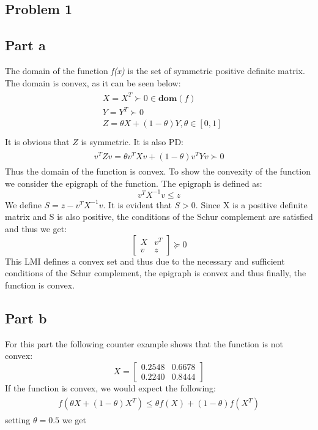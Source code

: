 \documentclass[a4paper]{article}
\begin{document}
\thispagestyle{empty}
\newpage
\begin{Large}
	\section*{Problem 1}
	\subsection*{Part a}
	The domain of the function \textit{f(x)} is the set of symmetric positive definite matrix. The domain is convex, as it can be seen below:
	\begin{align}
		\begin{split}
		 &X = X^T \succ 0 \in \mathbf{dom}(f)\\
		 &Y = Y^T \succ 0\\
		 &Z = \theta{X}+(1-\theta)Y,  \theta \in [0,1]\\
		\end{split}
	\end{align}
	It is obvious that $ Z $ is symmetric. It is also PD:
		\begin{align}
		\begin{split}
		v^TZv = \theta{v^TXv} + (1-\theta)v^TYv \succ 0
		\end{split}
	\end{align}
	Thus the domain of the function is convex. To show the convexity of the function we consider the epigraph of the function. The epigraph is defined as:
	\begin{equation}\label{key}
	v^TX^{-1}v \leq z
	\end{equation}
	We define $ S = z - v^TX^{-1}v $. It is evident that $ S > 0 $. Since X is a positive definite matrix and S is also positive, the conditions of the Schur complement are satisfied and thus we get:
	\[
	\begin{bmatrix}
	X & v^T\\
	v & z
	\end{bmatrix} \succeq 0
	\]
	This LMI defines a convex set and thus due to the necessary and sufficient conditions of the Schur complement, the epigraph is convex and thus finally, the function is convex.
	\subsection*{Part b}
	For this part the following counter example shows that the function is not convex:
	\[
	X=\begin{bmatrix}
	0.2548 & 0.6678\\
	0.2240 & 0.8444
	\end{bmatrix}
	\]
	If the function is convex, we would expect the following:
	\begin{align}
		\begin{split}
		f(\theta X +(1-\theta)X^T) \leq \theta f(X) +(1-\theta)f(X^T)
		\end{split}
	\end{align}
	setting $ \theta = 0.5$ we get
	

\end{Large}
\end{document}
